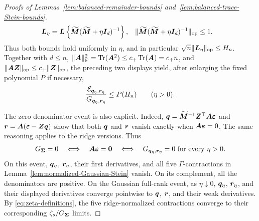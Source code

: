 \documentclass{article}
\theoremstyle{plain} %
\theoremstyle{definition} %
\theoremstyle{definition} %
\begin{document}
\begin{proof}[Proofs of Lemmas~\ref{lem:balanced-remainder-bounds}
and~\ref{lem:balanced-trace-Stein-bounds}]
\begin{align*}
    \boldsymbol{L}_\eta
    &=\boldsymbol{L}\left\{\widetilde{\boldsymbol{M}}
       (\widetilde{\boldsymbol{M}}+\eta\boldsymbol{I}_d)^{-1}\right\},
    &
    \lVert\widetilde{\boldsymbol{M}}
       (\widetilde{\boldsymbol{M}}+\eta\boldsymbol{I}_d)^{-1}\rVert_{\rm op}&\leq1.
\end{align*}
Thus both bounds hold uniformly in $\eta$, and in particular
$\sqrt n\lVert\boldsymbol{L}_\eta\rVert_{\rm op}\leq H_n$.  Together with $d\leq n$,
$\lVert\boldsymbol{A}\rVert_{\rm F}^2=\operatorname{Tr}(\boldsymbol{A}^2)\leq c_+\operatorname{Tr}(\boldsymbol{A})=c_+n$, and
$\lVert\boldsymbol{A}\boldsymbol{Z}\rVert_{\rm op}\leq c_+\lVert\boldsymbol{Z}\rVert_{\rm op}$, the preceding two
displays yield, after enlarging the fixed polynomial $P$ if necessary,
\begin{align}
    \frac{{\mathcal E}_{\boldsymbol{q}_\eta,\boldsymbol{r}_\eta}}{G_{\boldsymbol{q}_\eta,\boldsymbol{r}_\eta}}
    \leq P(H_n)
    \qquad(\eta>0).
    \label{eq:balanced-ridge-normalized-energy}
\end{align}

The zero-denominator event is also explicit. Indeed,
$\boldsymbol{q}=\widetilde{\boldsymbol{M}}^{-1}\boldsymbol{Z}^\top\boldsymbol{A}{\boldsymbol{\varepsilon} }$ and
$\boldsymbol{r}=\boldsymbol{A}({\boldsymbol{\varepsilon} }-\boldsymbol{Z}\boldsymbol{q})$ show that both $\boldsymbol{q}$ and $\boldsymbol{r}$
vanish exactly when $\boldsymbol{A}{\boldsymbol{\varepsilon} }=0$. The same reasoning applies to
the ridge versions. Thus
\begin{align*}
    G_{\boldsymbol{\Sigma}}=0
    \quad\Longleftrightarrow\quad
    \boldsymbol{A}{\boldsymbol{\varepsilon} }=\mathbf{0}
    \quad\Longleftrightarrow\quad
    G_{\boldsymbol{q}_\eta,\boldsymbol{r}_\eta}=0\ \text{for every }\eta>0.
\end{align*}
On this event, $\boldsymbol{q}_\eta$, $\boldsymbol{r}_\eta$, their first derivatives, and all five
$\Gamma$-contractions in Lemma~\ref{lem:normalized-Gaussian-Stein} vanish.  On
its complement, all the denominators are positive.  On the Gaussian full-rank
event, as $\eta\downarrow0$,
$\boldsymbol{q}_\eta$, $\boldsymbol{r}_\eta$, and their displayed derivatives converge pointwise to
$\boldsymbol{q}$, $\boldsymbol{r}$, and their weak derivatives.  By \eqref{eq:zeta-definitions},
the five ridge-normalized contractions converge to their corresponding
$\zeta_s/G_{\boldsymbol{\Sigma}}$ limits.


\end{proof}
\end{document}
